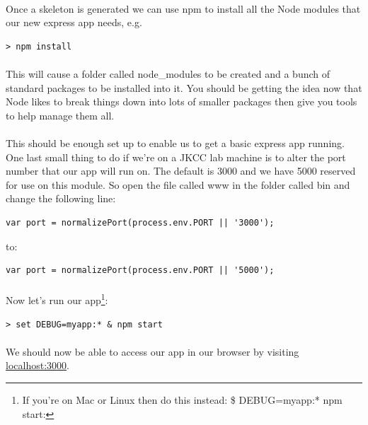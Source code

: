 \documentclass[10pt, a4paper, twosize]{article}
\begin{document}
\paragraph{} Once a skeleton is generated we can use npm to install all the Node modules that our new express app needs, e.g.

\begin{lstlisting}[style=DOS]
    > npm install
\end{lstlisting}

\paragraph{} This will cause a folder called node\_modules to be created and a bunch of standard packages to be installed into it. You should be getting the idea now that Node likes to break things down into lots of smaller packages then give you tools to help manage them all.

\paragraph{} This should be enough set up to enable us to get a basic express app running. One last small thing to do if we're on a JKCC lab machine is to alter the port number that our app will run on. The default is 3000 and we have 5000 reserved for use on this module. So open the file called www in the folder called bin and change the following line:

\begin{lstlisting}
var port = normalizePort(process.env.PORT || '3000');
\end{lstlisting}

to:

\begin{lstlisting}
var port = normalizePort(process.env.PORT || '5000');
\end{lstlisting}

\paragraph{} Now let's run our app\footnote{If you're on Mac or Linux then do this instead: \$ DEBUG=myapp:* npm start:}:

\begin{lstlisting}[style=DOS]
    > set DEBUG=myapp:* & npm start
\end{lstlisting}

\paragraph{} We should now be able to access our app in our browser by visiting \url{localhost:3000}.
\end{document}
